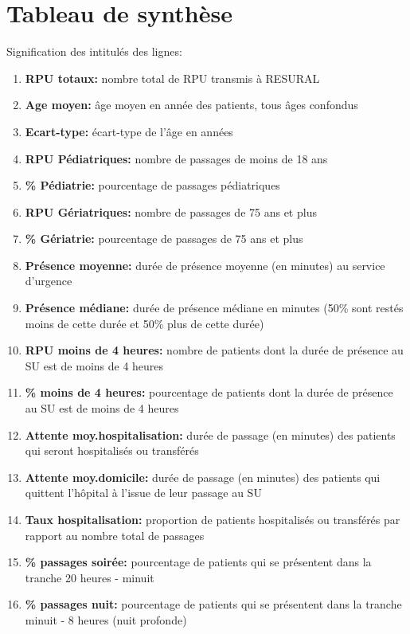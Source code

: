 \documentclass[12pt,english,french,twoside]{book}\usepackage[]{graphicx}\usepackage[]{color}
\begin{document}
\chapter{Tableau de synthèse}






Signification des intitulés des lignes:
\begin{enumerate}
  \item \textbf{RPU totaux:} nombre total de RPU transmis à RESURAL
  \item \textbf{Age moyen:} âge moyen en année des patients, tous âges confondus
  \item \textbf{Ecart-type:} écart-type de l'âge en années
  \item \textbf{RPU Pédiatriques:} nombre de passages de moins de 18 ans
  \item \textbf{\% Pédiatrie:} pourcentage de passages pédiatriques
  \item \textbf{RPU Gériatriques:} nombre de passages de 75 ans et plus
  \item \textbf{\% Gériatrie:} pourcentage de passages de 75 ans et plus
  \item \textbf{Présence moyenne:} durée de présence moyenne (en minutes) au service d'urgence
  \item \textbf{Présence médiane:} durée de présence médiane en minutes (50\% sont restés moins de cette durée et 50\% plus de cette durée)
  \item \textbf{RPU moins de 4 heures:} nombre de patients dont la durée de présence au SU est de moins de 4 heures
  \item \textbf{\% moins de 4 heures:} pourcentage de patients dont la durée de présence au SU est de moins de 4 heures
  \item \textbf{Attente moy.hospitalisation:} durée de passage (en minutes) des patients qui seront hospitalisés ou transférés
  \item \textbf{Attente moy.domicile:} durée de passage (en minutes) des patients qui quittent l'hôpital à l'issue de leur passage au SU
  \item \textbf{Taux hospitalisation:} proportion de patients hospitalisés ou transférés par rapport au nombre total de passages
  \item \textbf{\% passages soirée:} pourcentage de patients qui se présentent dans la tranche 20 heures - minuit
  \item \textbf{\% passages nuit:} pourcentage de patients qui se présentent dans la tranche minuit - 8 heures (nuit profonde)

\end{enumerate}
\end{document}
